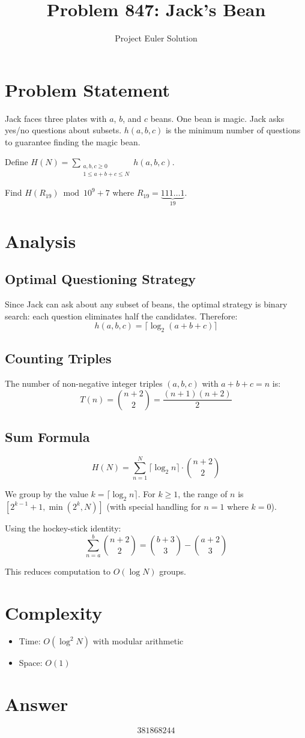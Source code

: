 \documentclass[12pt]{article}
\title{Problem 847: Jack's Bean}
\author{Project Euler Solution}
\date{}
\begin{document}
\maketitle

\section{Problem Statement}

Jack faces three plates with $a$, $b$, and $c$ beans. One bean is magic. Jack asks yes/no questions about subsets. $h(a,b,c)$ is the minimum number of questions to guarantee finding the magic bean.

Define $H(N) = \sum_{\substack{a,b,c \geq 0 \\ 1 \leq a+b+c \leq N}} h(a,b,c)$.

Find $H(R_{19}) \bmod 10^9+7$ where $R_{19} = \underbrace{111\ldots1}_{19}$.

\section{Analysis}

\subsection{Optimal Questioning Strategy}

Since Jack can ask about any subset of beans, the optimal strategy is binary search: each question eliminates half the candidates. Therefore:
\[
h(a,b,c) = \lceil \log_2(a+b+c) \rceil
\]

\subsection{Counting Triples}

The number of non-negative integer triples $(a,b,c)$ with $a+b+c = n$ is:
\[
T(n) = \binom{n+2}{2} = \frac{(n+1)(n+2)}{2}
\]

\subsection{Sum Formula}

\[
H(N) = \sum_{n=1}^{N} \lceil \log_2 n \rceil \cdot \binom{n+2}{2}
\]

We group by the value $k = \lceil \log_2 n \rceil$. For $k \geq 1$, the range of $n$ is $[2^{k-1}+1, \min(2^k, N)]$ (with special handling for $n=1$ where $k=0$).

Using the hockey-stick identity:
\[
\sum_{n=a}^{b} \binom{n+2}{2} = \binom{b+3}{3} - \binom{a+2}{3}
\]

This reduces computation to $O(\log N)$ groups.

\section{Complexity}

\begin{itemize}
    \item Time: $O(\log^2 N)$ with modular arithmetic
    \item Space: $O(1)$
\end{itemize}

\section{Answer}

\[
\boxed{381868244}
\]
\end{document}
